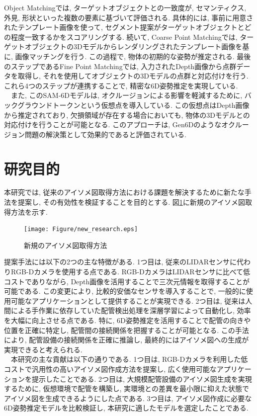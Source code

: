 Object Matchingでは, ターゲットオブジェクトとの一致度が, セマンティクス, 外見, 形状といった複数の要素に基づいて評価される. 
具体的には, 事前に用意されたテンプレート画像を使って, セグメント提案がターゲットオブジェクトとどの程度一致するかをスコアリングする. 
続いて, Coarse Point Matchingでは, ターゲットオブジェクトの3Dモデルからレンダリングされたテンプレート画像を基に, 画像マッチングを行う. 
この過程で, 物体の初期的な姿勢が推定される. 
最後のステップであるFine Point Matchingでは, 入力されたDepth画像から点群データを取得し, それを使用してオブジェクトの3Dモデルの点群と対応付けを行う. 
これら4つのステップが連携することで, 精密な6D姿勢推定を実現している. \\
　また, このSAM-6Dモデルは, オクルージョンによる影響を軽減するために, バックグラウンドトークンという仮想点を導入している. 
この仮想点はDepth画像から推定されており, 欠損領域が存在する場合においても, 物体の3Dモデルとの対応付けを行うことが可能となる. 
このアプローチは, Gen6Dのようなオクルージョン問題の解決策として効果的であると評価されている. 


\section{研究目的}
本研究では, 従来のアイソメ図取得方法における課題を解決するために新たな手法を提案し, その有効性を検証することを目的とする. 
図\ref{fig:f3}に新規のアイソメ図取得方法を示す. \\
\begin{figure}[htbt]
	\centering
	 \texttt{[image: Figure/new\_research.eps]}
	 \caption{新規のアイソメ図取得方法}
	 \label{fig:f3}
\end{figure}

提案手法には以下の2つの主な特徴がある. 
1つ目は, 従来のLIDARセンサに代わりRGB-Dカメラを使用する点である. 
RGB-DカメラはLIDARセンサに比べて低コストでありながら, Depth画像を活用することで三次元情報を取得することが可能である. 
この変更により, 比較的安価なセンサを導入することで, 一般的に使用可能なアプリケーションとして提供することが実現できる. 
2つ目は, 従来は人間による手作業に依存していた配管検出処理を深層学習によって自動化し, 効率を大幅に向上させる点である. 
特に, 6D姿勢推定を活用することで配管の向きや位置を正確に特定し, 配管間の接続関係を把握することが可能となる. 
この手法により, 配管設備の接続関係を正確に推論し, 最終的にはアイソメ図への生成が実現できると考えられる. \\
　本研究の主な貢献は以下の通りである. 
1つ目は, RGB-Dカメラを利用した低コストで汎用性の高いアイソメ図作成方法を提案し, 広く使用可能なアプリケーションを提示したことである. 
2つ目は, 大規模配管設備のアイソメ図生成を実現するために, 仮想環境で配管を構築し, 実環境との差異を最小限に抑えた状態でアイソメ図を生成できるようにした点である. 
3つ目は, アイソメ図作成に必要な6D姿勢推定モデルを比較検証し, 本研究に適したモデルを選定したことである. 


